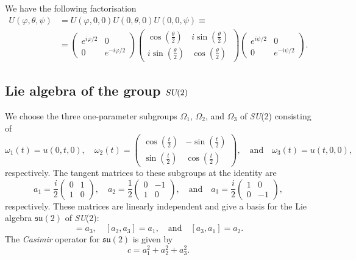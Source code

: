 \documentclass[12pt]{amsart}
\def\su2{\textsl{SU}(2)}
\def\lasu2{\mathfrak{su}(2)}
\theoremstyle{definition}
\theoremstyle{remark}
\numberwithin{equation}{section}
\begin{document}
We have the following factorisation 
\begin{equation}
	\begin{split}
	U(\varphi, \theta, \psi) &= U(\varphi, 0, 0)U(0, \theta, 0)U(0, 0, \psi) \equiv \\
	&= \begin{pmatrix}e^{i\varphi/2} & 0 \\ 0 & e^{-i\varphi/2}\end{pmatrix}\begin{pmatrix} \cos\left(\frac{\theta}{2}\right)& i\sin\left(\frac{\theta}{2}\right)\\ i\sin\left(\frac{\theta}{2}\right) & \cos\left(\frac{\theta}{2}\right)\end{pmatrix}\begin{pmatrix}e^{i\psi/2} & 0 \\ 0 & e^{-i\psi/2}\end{pmatrix}.
	\end{split}
\end{equation}



\subsection{Lie algebra of the group $\textsl{SU}(2)$}
We choose the three one-parameter subgroups $\Omega_1$, $\Omega_2$, and $\Omega_3$ of \su2 consisting of
\begin{equation}
	\omega_1(t) = u(0,t,0), \quad \omega_2(t) = \begin{pmatrix} \cos\left(\frac{t}{2}\right)& -\sin\left(\frac{t}{2}\right)\\ \sin\left(\frac{t}{2}\right) & \cos\left(\frac{t}{2}\right)\end{pmatrix}, \quad \text{and} \quad \omega_3(t) = u(t, 0, 0),
\end{equation}
respectively. The tangent matrices to these subgroups at the identity are
\begin{equation}
	a_1 = \frac{i}{2}\begin{pmatrix} 0& 1\\ 1 & 0\end{pmatrix}, \quad a_2 = \frac{1}{2}\begin{pmatrix} 0& -1\\ 1 & 0\end{pmatrix}, \quad \text{and} \quad a_3 = \frac{i}{2}\begin{pmatrix} 1 & 0\\ 0 & -1\end{pmatrix},
\end{equation}
respectively. These matrices are linearly independent and give a basis for the Lie algebra $\lasu2$ of \su2:
\begin{equation}
	[a_1, a_2] = a_3, \quad [a_2, a_3] = a_1, \quad \text{and} \quad [a_3, a_1] = a_2.
\end{equation}
The \emph{Casimir} operator for $\lasu2$ is given by
\begin{equation}
	c = a_1^2 + a_2^2 +a_3^2.
\end{equation}
\end{document}
